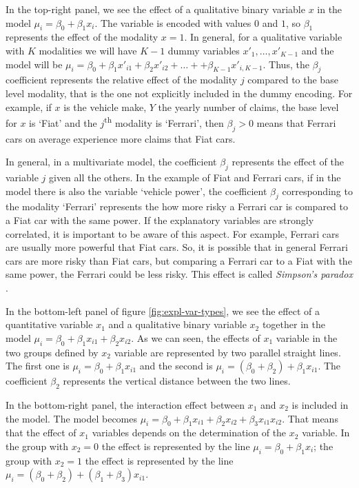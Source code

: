 \documentclass[a4paper, twoside, openright, 12pt]{report}
\theoremstyle{definition}
\theoremstyle{definition}
\theoremstyle{definition}
\theoremstyle{remark}
\begin{document}
In the top-right panel, we see the effect of a qualitative binary variable \(x\) in the model \(\mu_i = \beta_0 + \beta_1 x_i\). The variable is encoded with values \(0\) and \(1\), so \(\beta_1\) represents the effect of the modality \(x=1\). In general, for a qualitative variable with \(K\) modalities we will have \(K-1\) dummy variables \(x'_1, \dots, x'_{K-1}\) and the model will be \(\mu_i = \beta_0 + \beta_1 x'_{i1} + \beta_2 x'_{i2} + \dots + + \beta_{K-1} x'_{i, K-1}\). Thus, the \(\beta_j\) coefficient represents the relative effect of the modality \(j\) compared to the base level modality, that is the one not explicitly included in the dummy encoding. For example, if \(x\) is the vehicle make, \(Y\) the yearly number of claims, the base level for \(x\) is `Fiat' and the \(j\)\textsuperscript{th} modality is `Ferrari', then \(\beta_j>0\) means that Ferrari cars on average experience more claims that Fiat cars.

In general, in a multivariate model, the coefficient \(\beta_j\) represents the effect of the variable \(j\) given all the others. In the example of Fiat and Ferrari cars, if in the model there is also the variable `vehicle power', the coefficient \(\beta_j\) corresponding to the modality `Ferrari' represents the how more risky a Ferrari car is compared to a Fiat car with the same power. If the explanatory variables are strongly correlated, it is important to be aware of this aspect. For example, Ferrari cars are usually more powerful that Fiat cars. So, it is possible that in general Ferrari cars are more risky than Fiat cars, but comparing a Ferrari car to a Fiat with the same power, the Ferrari could be less risky. This effect is called \emph{Simpson's paradox} \autocite{blyth1972simpson}.

In the bottom-left panel of figure \ref{fig:expl-var-types}, we see the effect of a quantitative variable \(x_1\) and a qualitative binary variable \(x_2\) together in the model \(\mu_i = \beta_0 + \beta_1 x_{i1} + \beta_2 x_{i2}\). As we can seen, the effects of \(x_1\) variable in the two groups defined by \(x_2\) variable are represented by two parallel straight lines. The first one is \(\mu_i = \beta_0 + \beta_1 x_{i1}\) and the second is \(\mu_i = \left(\beta_0 + \beta_2\right) + \beta_1 x_{i1}\). The coefficient \(\beta_2\) represents the vertical distance between the two lines.

In the bottom-right panel, the interaction effect between \(x_1\) and \(x_2\) is included in the model. The model becomes \(\mu_i = \beta_0 + \beta_1 x_{i1} + \beta_2 x_{i2} + \beta_3 x_{i1} x_{i2}\). That means that the effect of \(x_1\) variables depends on the determination of the \(x_2\) variable. In the group with \(x_2=0\) the effect is represented by the line \(\mu_i = \beta_0 + \beta_1 x_i\); the group with \(x_2=1\) the effect is represented by the line \(\mu_i = \left(\beta_0 + \beta_2\right) + \left(\beta_1 + \beta_3\right) x_{i1}\).
\end{document}
